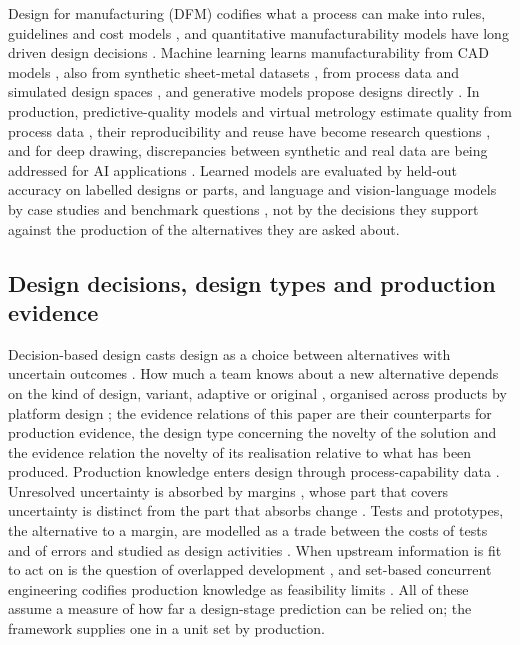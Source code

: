 \documentclass[pdflatex,sn-basic,lineno]{sn-jnl}
\begin{document}
Design for manufacturing (DFM) codifies what a process can make into rules, guidelines and cost models \citep{boothroyd2010product}, and quantitative manufacturability models have long driven design decisions \citep{latrobe2003design}. Machine learning learns manufacturability from CAD models \citep{ghadai2018learning, zhang2018featurenet}, also from synthetic sheet-metal datasets \citep{ballegeer2026bendfm}, from process data and simulated design spaces \citep{yan2026machine}, and generative models propose designs directly \citep{regenwetter2022deep}. In production, predictive-quality models and virtual metrology estimate quality from process data \citep{wuest2016machine, tercan2022machine, dreyfus2022virtual}, their reproducibility and reuse have become research questions \citep{xie2025reproducible, xie2026reusability}, and for deep drawing, discrepancies between synthetic and real data are being addressed for AI applications \citep{baum2026addressing}. Learned models are evaluated by held-out accuracy on labelled designs or parts, and language and vision-language models by case studies \citep{makatura2024how} and benchmark questions \citep{picard2025concept}, not by the decisions they support against the production of the alternatives they are asked about.

\subsection{Design decisions, design types and production evidence}

Decision-based design casts design as a choice between alternatives with uncertain outcomes \citep{hazelrigg1998framework}. How much a team knows about a new alternative depends on the kind of design, variant, adaptive or original \citep{pahl2007engineering}, organised across products by platform design \citep{simpson2006product}; the evidence relations of this paper are their counterparts for production evidence, the design type concerning the novelty of the solution and the evidence relation the novelty of its realisation relative to what has been produced. Production knowledge enters design through process-capability data \citep{thornton2004variation, tata1999process}. Unresolved uncertainty is absorbed by margins \citep{eckert2019design}, whose part that covers uncertainty is distinct from the part that absorbs change \citep{eckert2017safety}. Tests and prototypes, the alternative to a margin, are modelled as a trade between the costs of tests and of errors \citep{thomke1998simulation, thomke2001sequential, salado2018mathematical} and studied as design activities \citep{tahera2019testing}. When upstream information is fit to act on is the question of overlapped development \citep{krishnan1997model, terwiesch2002exchanging}, and set-based concurrent engineering codifies production knowledge as feasibility limits \citep{sobek1999toyota}. All of these assume a measure of how far a design-stage prediction can be relied on; the framework supplies one in a unit set by production.
\end{document}
